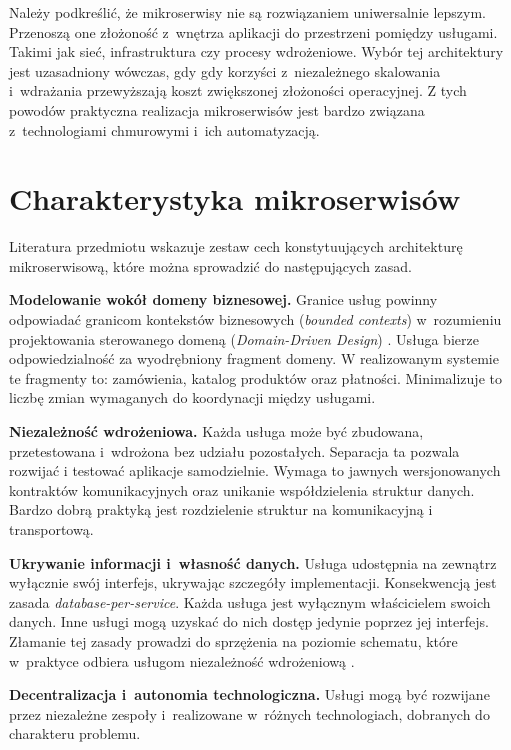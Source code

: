 Należy podkreślić, że mikroserwisy nie są rozwiązaniem uniwersalnie lepszym. Przenoszą one złożoność z~wnętrza aplikacji
do przestrzeni pomiędzy usługami. Takimi jak sieć, infrastruktura czy procesy wdrożeniowe. Wybór tej architektury jest
uzasadniony wówczas, gdy gdy korzyści z~niezależnego skalowania i~wdrażania przewyższają koszt zwiększonej
złożoności operacyjnej. Z tych powodów praktyczna realizacja mikroserwisów jest bardzo związana z~technologiami
chmurowymi i~ich automatyzacją.

\section{Charakterystyka mikroserwisów}
\label{sec:charakterystyka-mikroserwisow}

Literatura przedmiotu \parencite{newman2021,richardson2018} wskazuje zestaw cech konstytuujących architekturę
mikroserwisową, które można sprowadzić do następujących zasad.

\textbf{Modelowanie wokół domeny biznesowej.} Granice usług powinny odpowiadać granicom kontekstów biznesowych
(\emph{bounded contexts}) w~rozumieniu projektowania sterowanego domeną (\emph{Domain-Driven Design}) \parencite{evans2003}.
Usługa bierze odpowiedzialność za wyodrębniony fragment domeny. W realizowanym systemie te fragmenty to:
zamówienia, katalog produktów oraz płatności. Minimalizuje to liczbę zmian wymaganych do koordynacji między
usługami.

\textbf{Niezależność wdrożeniowa.} Każda usługa może być zbudowana, przetestowana i~wdrożona bez udziału pozostałych. 
Separacja ta pozwala rozwijać i testować aplikacje samodzielnie. Wymaga to jawnych wersjonowanych kontraktów komunikacyjnych 
oraz unikanie współdzielenia struktur danych. Bardzo dobrą praktyką jest rozdzielenie struktur na komunikacyjną i transportową.

\textbf{Ukrywanie informacji i~własność danych.} Usługa udostępnia na zewnątrz wyłącznie swój interfejs, ukrywając
szczegóły implementacji. Konsekwencją jest zasada \emph{database-per-service}. Każda usługa jest wyłącznym właścicielem swoich danych.
Inne usługi mogą uzyskać do nich dostęp jedynie poprzez jej interfejs. Złamanie tej zasady prowadzi do sprzężenia na poziomie schematu, 
które w~praktyce odbiera usługom niezależność wdrożeniową \parencite{newman2021}.

\textbf{Decentralizacja i~autonomia technologiczna.} Usługi mogą być rozwijane przez niezależne zespoły 
i~realizowane w~różnych technologiach, dobranych do charakteru problemu.

